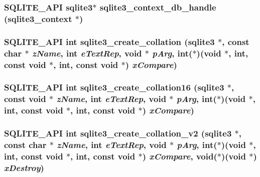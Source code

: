 \subsubsection{\setlength{\rightskip}{0pt plus 5cm}SQLITE\_\-API \bf{sqlite3}$\ast$ sqlite3\_\-context\_\-db\_\-handle (\bf{sqlite3\_\-context} $\ast$)}\label{3_87_83_2sqlite3_8h_cdb21c1e62f29c7f5e02c2286077dec5}


\subsubsection{\setlength{\rightskip}{0pt plus 5cm}SQLITE\_\-API int sqlite3\_\-create\_\-collation (\bf{sqlite3} $\ast$, const char $\ast$ {\em z\-Name}, int {\em e\-Text\-Rep}, void $\ast$ {\em p\-Arg}, int($\ast$)(void $\ast$, int, const void $\ast$, int, const void $\ast$) {\em x\-Compare})}\label{3_87_83_2sqlite3_8h_18e68b175a19b53afe09b608a6965f1b}


\subsubsection{\setlength{\rightskip}{0pt plus 5cm}SQLITE\_\-API int sqlite3\_\-create\_\-collation16 (\bf{sqlite3} $\ast$, const void $\ast$ {\em z\-Name}, int {\em e\-Text\-Rep}, void $\ast$ {\em p\-Arg}, int($\ast$)(void $\ast$, int, const void $\ast$, int, const void $\ast$) {\em x\-Compare})}\label{3_87_83_2sqlite3_8h_525239b46e0f69f7c3a2a28a35d3ff20}


\subsubsection{\setlength{\rightskip}{0pt plus 5cm}SQLITE\_\-API int sqlite3\_\-create\_\-collation\_\-v2 (\bf{sqlite3} $\ast$, const char $\ast$ {\em z\-Name}, int {\em e\-Text\-Rep}, void $\ast$ {\em p\-Arg}, int($\ast$)(void $\ast$, int, const void $\ast$, int, const void $\ast$) {\em x\-Compare}, void($\ast$)(void $\ast$) {\em x\-Destroy})}\label{3_87_83_2sqlite3_8h_2cd7da719748dbeb98b73444ed62c9cf}


